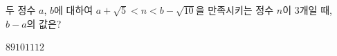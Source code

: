 두 정수 $a$, $b$에 대하여 $a+\sqrt{5}<n<b-\sqrt{10}$을 만족시키는 정수 $n$이 $3$개일 때, $b-a$의 값은?
\begin{choices32}{$8$}{$9$}{$10$}{$11$}{$12$}\end{choices32}

